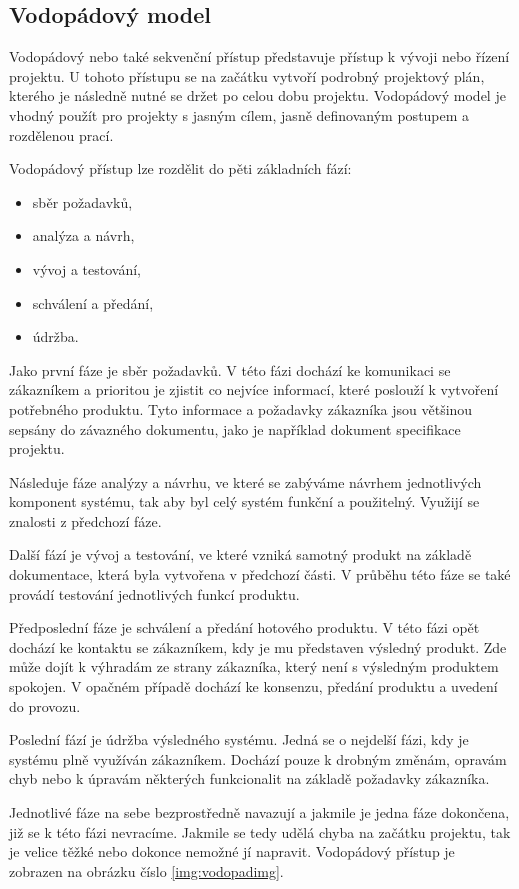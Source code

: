 \documentclass[czech,DP]{thesiskiv}
\begin{document}
\subsection{Vodopádový model}
Vodopádový nebo také sekvenční přístup představuje přístup k vývoji nebo řízení projektu. U tohoto přístupu se na začátku vytvoří podrobný projektový plán, kterého je následně nutné se držet po celou dobu projektu. Vodopádový model je vhodný použít pro projekty s jasným cílem, jasně definovaným postupem a rozdělenou prací.\cite{vodopad}
\par
Vodopádový přístup lze rozdělit do pěti základních fází:
\begin{itemize}
    \item sběr požadavků,
    \item analýza a návrh,
    \item vývoj a testování,
    \item schválení a předání,
    \item údržba.
\end{itemize}
Jako první fáze je sběr požadavků. V této fázi dochází ke komunikaci se zákazníkem a prioritou je zjistit co nejvíce informací, které poslouží k vytvoření potřebného produktu. Tyto informace a požadavky zákazníka jsou většinou sepsány do závazného dokumentu, jako je například dokument specifikace projektu.
\par
Následuje fáze analýzy a návrhu, ve které se zabýváme návrhem jednotlivých komponent systému, tak aby byl celý systém funkční a použitelný. Využijí se znalosti z předchozí fáze.
\par
Další fází je vývoj a testování, ve které vzniká samotný produkt na základě dokumentace, která byla vytvořena v předchozí části. V průběhu této fáze se také provádí testování jednotlivých funkcí produktu.
\par
Předposlední fáze je schválení a předání hotového produktu. V této fázi opět dochází ke kontaktu se zákazníkem, kdy je mu představen výsledný produkt. Zde může dojít k výhradám ze strany zákazníka, který není s výsledným produktem spokojen. V opačném případě dochází ke konsenzu, předání produktu a uvedení do provozu.
\par
Poslední fází je údržba výsledného systému. Jedná se o nejdelší fázi, kdy je systému plně využíván zákazníkem. Dochází pouze k drobným změnám, opravám chyb nebo k úpravám některých funkcionalit na základě požadavky zákazníka.
\par
Jednotlivé fáze na sebe bezprostředně navazují a jakmile je jedna fáze dokončena, již se k této fázi nevracíme. Jakmile se tedy udělá chyba na začátku projektu, tak je velice těžké nebo dokonce nemožné jí napravit. Vodopádový přístup je zobrazen na obrázku číslo \ref{img:vodopadimg}.
\end{document}
